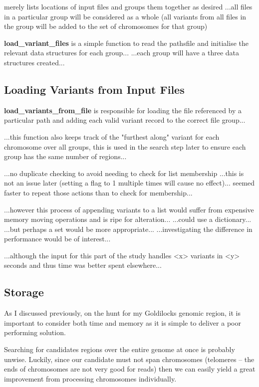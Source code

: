 merely lists locations of input files and groups them together as desired
...all files in a particular group will be considered as a whole (all variants
from all files in the group will be added to the set of chromosomes for that
group)

\textbf{load\_variant\_files} is a simple function to read the pathsfile and
initialise the relevant data structures for each group...
...each group will have a three data structures created...


\subsection{Loading Variants from Input Files}

\textbf{load\_variants\_from\_file} is responsible for loading the file
referenced by a particular path and adding each valid variant record to the
correct file group...

...this function also keeps track of the "furthest along" variant for each
chromosome over all groups, this is used in the search step later to ensure each
group has the same number of regions...

...no duplicate checking to avoid needing to check for list membership
...this is not an issue later (setting a flag to 1 multiple times will cause no
effect)... seemed faster to repeat those actions than to check for membership...

...however this process of appending variants to a list would suffer from
expensive memory moving operations and is ripe for alteration...
...could use a dictionary...
...but perhaps a set would be more appropriate...
...investigating the difference in performance would be of interest...

...although the input for this part of the study handles <x> variants in <y>
seconds and thus time was better spent elsewhere...



\subsection{Storage}

As I discussed previously, on the hunt for my Goldilocks genomic region, it is
important to consider both time and memory as it is simple to deliver a poor
performing solution.

Searching for candidates regions over the entire genome at once is probably
unwise. Luckily, since our candidate must not span chromosomes (telomeres --
the ends of chromosomes are not very good for reads) then we can easily yield a
great improvement from processing chromosomes individually.

